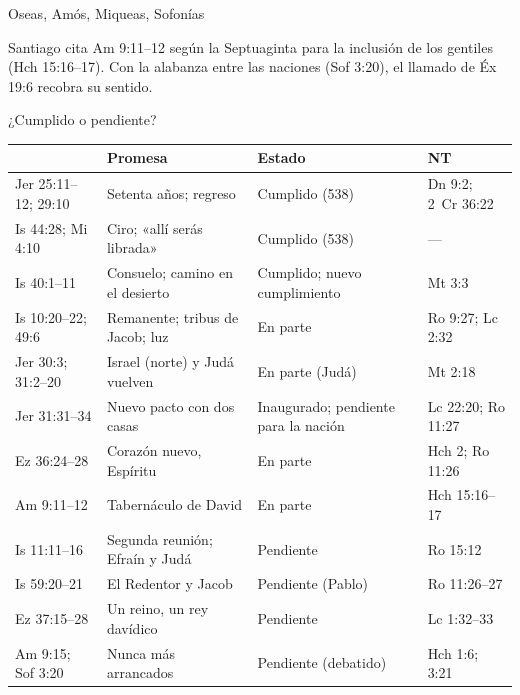 \begin{frame}{Oseas, Amós, Miqueas, Sofonías}
\centering
{}
\elabpropia
\begin{notalam}
Santiago cita Am 9:11--12 según la Septuaginta para la inclusión de los gentiles (Hch 15:16--17). Con la alabanza entre las naciones (Sof 3:20), el llamado de Éx 19:6 recobra su sentido.
\end{notalam}
\end{frame}

\begin{frame}{¿Cumplido o pendiente?}
\centering\fontsize{6.5}{7.8}\selectfont\renewcommand{\arraystretch}{1.12}
\begin{tabular}{>{\RaggedRight\arraybackslash}p{2.1cm}>{\RaggedRight\arraybackslash}p{3.9cm}>{\RaggedRight\arraybackslash}p{2.3cm}>{\RaggedRight\arraybackslash}p{2.6cm}}
\toprule
{\color{ladrillo}\bfseries Texto} & {\color{ladrillo}\bfseries Promesa} & {\color{ladrillo}\bfseries Estado} & {\color{ladrillo}\bfseries NT}\\\midrule
Jer 25:11--12; 29:10 & Setenta años; regreso & Cumplido (538) & Dn 9:2; 2~Cr 36:22\\
Is 44:28; Mi 4:10 & Ciro; «allí serás librada» & Cumplido (538) & ---\\
Is 40:1--11 & Consuelo; camino en el desierto & Cumplido; nuevo cumplimiento & Mt 3:3\\
Is 10:20--22; 49:6 & Remanente; tribus de Jacob; luz & En parte & Ro 9:27; Lc 2:32\\
Jer 30:3; 31:2--20 & Israel (norte) y Judá vuelven & En parte (Judá) & Mt 2:18\\
Jer 31:31--34 & Nuevo pacto con dos casas & Inaugurado; pendiente para la nación & Lc 22:20; Ro 11:27\\
Ez 36:24--28 & Corazón nuevo, Espíritu & En parte & Hch 2; Ro 11:26\\
Am 9:11--12 & Tabernáculo de David & En parte & Hch 15:16--17\\
Is 11:11--16 & Segunda reunión; Efraín y Judá & Pendiente & Ro 15:12\\
Is 59:20--21 & El Redentor y Jacob & Pendiente (Pablo) & Ro 11:26--27\\
Ez 37:15--28 & Un reino, un rey davídico & Pendiente & Lc 1:32--33\\
Am 9:15; Sof 3:20 & Nunca más arrancados & Pendiente (debatido) & Hch 1:6; 3:21\\
\bottomrule
\end{tabular}
\end{frame}

